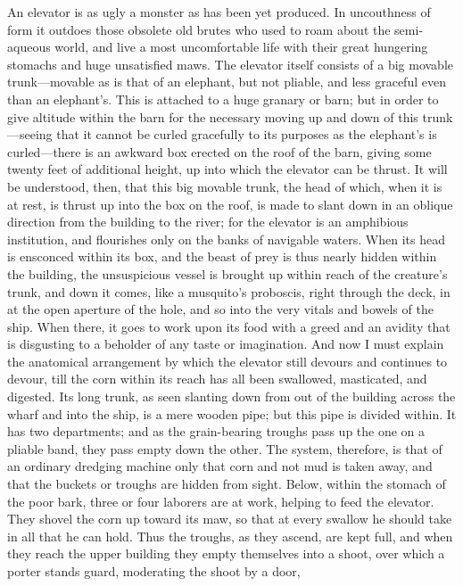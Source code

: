 An elevator is as ugly a monster as has been yet produced.  In
uncouthness of form it outdoes those obsolete old brutes who used
to roam about the semi-aqueous world, and live a most uncomfortable
life with their great hungering stomachs and huge unsatisfied maws.
The elevator itself consists of a big movable trunk---movable as is
that of an elephant, but not pliable, and less graceful even than
an elephant's.  This is attached to a huge granary or barn; but in
order to give altitude within the barn for the necessary moving up
and down of this trunk---seeing that it cannot be curled gracefully
to its purposes as the elephant's is curled---there is an awkward
box erected on the roof of the barn, giving some twenty feet of
additional height, up into which the elevator can be thrust.  It
will be understood, then, that this big movable trunk, the head of
which, when it is at rest, is thrust up into the box on the roof,
is made to slant down in an oblique direction from the building to
the river; for the elevator is an amphibious institution, and
flourishes only on the banks of navigable waters.  When its head is
ensconced within its box, and the beast of prey is thus nearly
hidden within the building, the unsuspicious vessel is brought up
within reach of the creature's trunk, and down it comes, like a
musquito's proboscis, right through the deck, in at the open
aperture of the hole, and so into the very vitals and bowels of the
ship.  When there, it goes to work upon its food with a greed and
an avidity that is disgusting to a beholder of any taste or
imagination.  And now I must explain the anatomical arrangement by
which the elevator still devours and continues to devour, till the
corn within its reach has all been swallowed, masticated, and
digested.  Its long trunk, as seen slanting down from out of the
building across the wharf and into the ship, is a mere wooden pipe;
but this pipe is divided within.  It has two departments; and as
the grain-bearing troughs pass up the one on a pliable band, they
pass empty down the other.  The system, therefore, is that of an
ordinary dredging machine only that corn and not mud is taken away,
and that the buckets or troughs are hidden from sight.  Below,
within the stomach of the poor bark, three or four laborers are at
work, helping to feed the elevator.  They shovel the corn up toward
its maw, so that at every swallow he should take in all that he can
hold.  Thus the troughs, as they ascend, are kept full, and when
they reach the upper building they empty themselves into a shoot,
over which a porter stands guard, moderating the shoot by a door,
